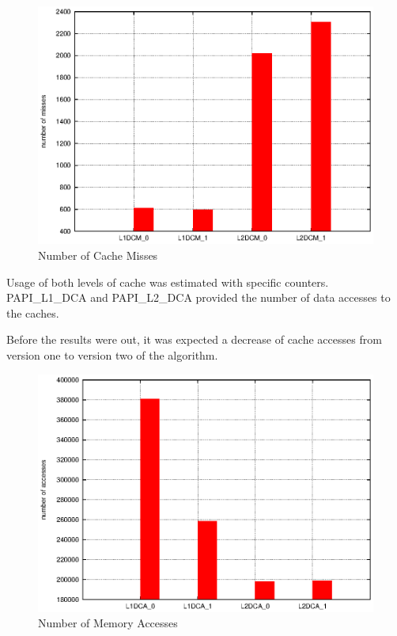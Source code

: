 \documentclass[a4paper,10pt,openright,openbib,twocolumn]{article}
\begin{document}
\begin{figure}[!htp]
	\centering
	\begin{minipage}[t]{\columnwidth}
		\includegraphics[width=\textwidth]{images/misses.eps}
		\caption{Number of Cache Misses \label{fig:cachel1}}
	\end{minipage}
\end{figure} 

Usage of both levels of cache was estimated with specific counters. PAPI\_L1\_DCA and PAPI\_L2\_DCA provided the number of data accesses to the caches.

Before the results were out, it was expected a decrease of cache accesses from version one to version two of the algorithm.

\begin{figure}[!htp]
	\centering
	\begin{minipage}[t]{\columnwidth}
		\includegraphics[width=\textwidth]{images/totals.eps}
		\caption{Number of Memory Accesses \label{fig:cachel1}}
	\end{minipage}
\end{figure}
\end{document}
